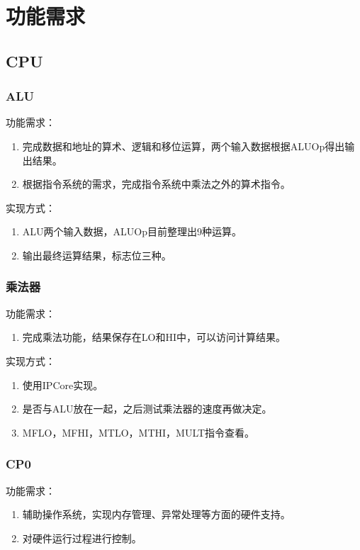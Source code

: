 \section{功能需求}
    \subsection{CPU}
        \subsubsection{ALU}
            功能需求：
            \begin{enumerate}
            \item
            完成数据和地址的算术、逻辑和移位运算，两个输入数据根据ALUOp得出输出结果。
            \item
            根据指令系统的需求，完成指令系统中乘法之外的算术指令。
            \end{enumerate}

            实现方式：
            \begin{enumerate}
            \item
            ALU两个输入数据，ALUOp目前整理出9种运算。
            \item
            输出最终运算结果，标志位三种。
            \end{enumerate}

        \subsubsection{乘法器}
            功能需求：
            \begin{enumerate}
            \item
            完成乘法功能，结果保存在LO和HI中，可以访问计算结果。
            \end{enumerate}

            实现方式：
            \begin{enumerate}
            \item
            使用IPCore实现。
            \item
            是否与ALU放在一起，之后测试乘法器的速度再做决定。
            \item
            MFLO，MFHI，MTLO，MTHI，MULT指令查看。
            \end{enumerate}

        \subsubsection{CP0}
            功能需求：
            \begin{enumerate}
            \item
            辅助操作系统，实现内存管理、异常处理等方面的硬件支持。
            \item
            对硬件运行过程进行控制。
            \end{enumerate}

